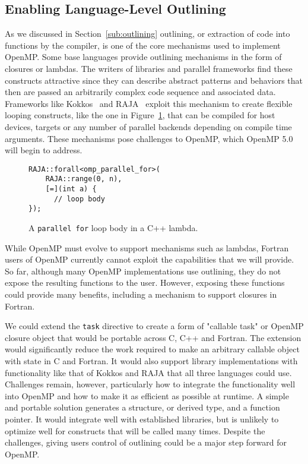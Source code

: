 \subsection{Enabling Language-Level Outlining}
\label{sub:enabling_language_level_outlining}

As we discussed in Section~\ref{sub:outlining} outlining, or extraction 
of code into functions by the compiler, is one of the core mechanisms 
used to implement OpenMP. Some base languages provide outlining mechanisms 
in the form of closures or lambdas. The writers of libraries and parallel 
frameworks find these constructs attractive since they can describe abstract 
patterns and behaviors that then are passed an arbitrarily complex code 
sequence and associated data. Frameworks like Kokkos~\cite{kokkos} and 
RAJA~\cite{raja} exploit this mechanism to create flexible looping constructs, 
like the one in Figure~\ref{fig:raja}, that can be compiled for host devices, 
targets or any number of parallel backends depending on compile time arguments.
These mechanisms pose challenges to OpenMP, which OpenMP 5.0 will begin to
address.

\begin{figure}
\begin{verbatim}
RAJA::forall<omp_parallel_for>(
    RAJA::range(0, n),
    [=](int a) {
      // loop body
});
\end{verbatim}
\caption{A \texttt{parallel for} loop body in a C++ lambda.\label{fig:raja}}
\end{figure}

While OpenMP must evolve to support mechanisms such as lambdas, Fortran
users of OpenMP currently cannot exploit the capabilities that we will 
provide. So far, although many OpenMP implementations use outlining, they 
do not expose the resulting functions to the user. However, exposing these 
functions could provide many benefits, including a mechanism to support
closures in Fortran.
 
We could extend the \texttt{task} directive to create a form 
of "callable task" or OpenMP closure object that would be portable across 
C, C++ and Fortran. The extension would significantly reduce the work 
required to make an arbitrary callable object with state in C and Fortran.
It would also support library implementations with functionality like that 
of Kokkos and RAJA that all three languages could use. Challenges remain,
however, particularly how to integrate the functionality well into OpenMP 
and how to make it as efficient as possible at runtime. A simple and 
portable solution generates a structure, or derived type, and a function 
pointer. It would integrate well with established libraries, but is unlikely 
to optimize well for constructs that will be called many times. Despite 
the challenges, giving users control of outlining could be
a major step forward for OpenMP.


